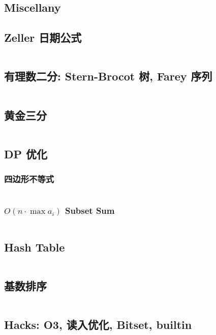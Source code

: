 \documentclass[titlepage, a4paper, 11pt]{article}
\begin{document}
\begin{spacing}{1.15}
			\section{Miscellany}
				\subsection{Zeller 日期公式}
					\inputminted{cpp}{src/Miscellany/日期公式.cpp}
				\subsection{有理数二分: Stern-Brocot 树, Farey 序列}
					\inputminted{python}{src/yzh/farey.py}
				\subsection{黄金三分}
					\inputminted[highlightlines={7}]{cpp}{src/yzh/golden_ternary.cpp}
				\subsection{DP 优化}
				\subsubsection{四边形不等式}
					\inputminted{cpp}{src/Miscellany/2D1D.cpp}
					
				\subsubsection{$O(n \cdot \max a_i)$ Subset Sum}
					\inputminted{cpp}{src/yzh/Subset Sum.cpp}

				\newpage
				\subsection{Hash Table}
					\inputminted[highlightlines={4,15,17,18}]{cpp}{src/DataStructure/hashmap.cpp}
				\subsection{基数排序}
					\inputminted{cpp}{src/Miscellany/RadixSort.cpp}
				\subsection{Hacks: O3, 读入优化, Bitset, builtin}
					\inputminted{cpp}{src/Miscellany/hack.cpp}

\end{spacing}
\end{document}
